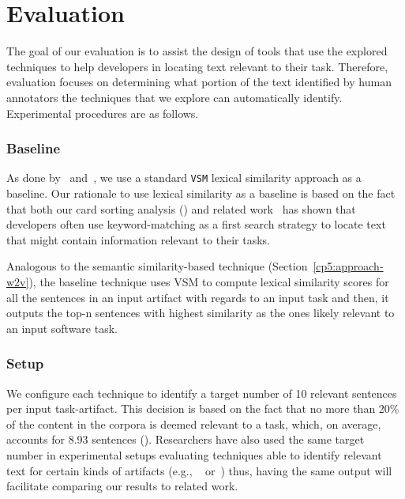 \clearpage

\section{Evaluation}
\label{cp5:evaluation}



The goal of our evaluation is to assist the design of tools that use the explored techniques to help developers in locating text relevant to their task.
Therefore, evaluation focuses 
on determining what portion of the text identified by human annotators the techniques that we explore can automatically identify.
Experimental procedures are as follows.



\subsubsection{Baseline}


As done by~\cite{Lin2021} and~\cite{Ye2016}, we use a standard \texttt{VSM} lexical similarity approach as a baseline. Our rationale to use 
lexical similarity as a baseline is based on the fact that 
both our card sorting analysis () and related work~\cite{Ko2006a, Freund2015} has shown that developers often use keyword-matching as a first search strategy to locate text that might contain information relevant to their tasks.


Analogous to the semantic similarity-based technique (Section~\ref{cp5:approach-w2v}), the baseline technique uses VSM to compute lexical similarity scores 
for all the sentences in an input artifact with regards to an input task and then, it outputs the top-n sentences with highest similarity as the ones likely relevant to an input software task.




\subsubsection{Setup}



We configure each technique to identify a target number of 10 relevant sentences per input task-artifact.
This decision is based on the fact that 
no more than 20\% of the content in the corpora is deemed relevant to a task, which, on average, accounts for 8.93 sentences ().
Researchers have also used the same target number in experimental setups evaluating techniques able to identify relevant text for certain kinds of artifacts (e.g., ~\cite{Xu2017} or~\cite{Lotufo2012})
thus, having the same output will facilitate comparing our results to related work.


